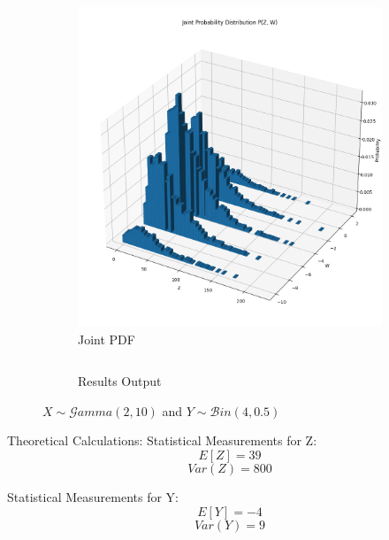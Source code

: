 \documentclass{article}
\begin{document}
\begin{figure}[H]
\begin{subfigure}{0.45\textwidth}
    \includegraphics[width=\linewidth]{results/section3/c(2).png}
    \caption{Joint PDF}
  \end{subfigure}
  \begin{subfigure}{\textwidth}
    \centering
    \inputminted{text}{results/section3/c.txt}
    \caption{Results Output}
  \end{subfigure}
  \caption{$X \sim \mathcal{G}amma(2,10)$ and $Y \sim \mathcal{B}in(4,0.5)$}
\end{figure}
Theoretical Calculations:
Statistical Measurements for Z:
$$E[Z] = 39$$
$$Var(Z) = 800$$

Statistical Measurements for Y:
$$E[Y] = -4$$
$$Var(Y) = 9$$
\newpage
\end{document}
